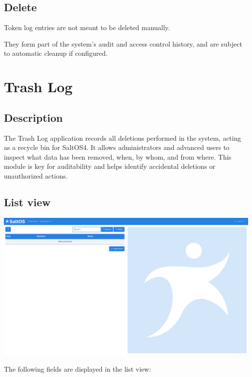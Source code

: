 \documentclass[a4paper]{article}
\begin{document}
\hypertarget{toc30}{}
\subsection{Delete}

Token log entries are not meant to be deleted manually.

They form part of the system’s audit and access control history, and are subject to automatic cleanup if configured.


\hypertarget{toc31}{}
\section{Trash Log}

\hypertarget{toc32}{}
\subsection{Description}

The Trash Log application records all deletions performed in the system, acting as a recycle bin for SaltOS4.
It allows administrators and advanced users to inspect what data has been removed, when, by whom, and from where.
This module is key for auditability and helps identify accidental deletions or unauthorized actions.

\hypertarget{toc33}{}
\subsection{List view}

\begin{center}\includegraphics[width=1\textwidth]{../ujest/snaps/test-screenshots-js-screenshots-common-trashlog-list-en-us-1-snap.png}\end{center}

The following fields are displayed in the list view:
\end{document}
